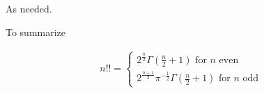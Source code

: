 \documentclass[12pt]{article}
\begin{document}
As needed.

To summarize

\begin{align}
n!! = \begin{cases}
2^{\frac{n}{2}}\Gamma\left(\frac{n}{2}+1\right) \text{ for } n \text{ even}\\
2^{\frac{n+1}{2}} \pi^{-\frac{1}{2}} \Gamma\left( \frac{n}{2}+1\right) \text{ for } n \text{ odd}
\end{cases}
\end{align}
\end{document}
